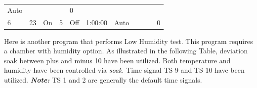 \begin{longtable}[]{@{}lllllllllll@{}}
\begin{minipage}[t]{0.08\columnwidth}
Auto\strut
\end{minipage} & \begin{minipage}[t]{0.04\columnwidth}\raggedright
\strut
\end{minipage} & \begin{minipage}[t]{0.05\columnwidth}\raggedright
\strut
\end{minipage} & \begin{minipage}[t]{0.03\columnwidth}\raggedright
\strut
\end{minipage} & \begin{minipage}[t]{0.03\columnwidth}\raggedright
0\strut
\end{minipage}\tabularnewline
\begin{minipage}[t]{0.09\columnwidth}\raggedright
6\strut
\end{minipage} & \begin{minipage}[t]{0.05\columnwidth}\raggedright
23\strut
\end{minipage} & \begin{minipage}[t]{0.09\columnwidth}\raggedright
On\strut
\end{minipage} & \begin{minipage}[t]{0.06\columnwidth}\raggedright
5\strut
\end{minipage} & \begin{minipage}[t]{0.06\columnwidth}\raggedright
Off\strut
\end{minipage} & \begin{minipage}[t]{0.12\columnwidth}\raggedright
1:00:00\strut
\end{minipage} & \begin{minipage}[t]{0.08\columnwidth}\raggedright
Auto\strut
\end{minipage} & \begin{minipage}[t]{0.04\columnwidth}\raggedright
\strut
\end{minipage} & \begin{minipage}[t]{0.05\columnwidth}\raggedright
\strut
\end{minipage} & \begin{minipage}[t]{0.03\columnwidth}\raggedright
\strut
\end{minipage} & \begin{minipage}[t]{0.03\columnwidth}\raggedright
0\strut
\end{minipage}\tabularnewline
\bottomrule
\end{longtable}

Here is another program that performs Low Humidity test. This program
requires a chamber with humidity option. As illustrated in the following
Table, deviation soak between plus and minus 10 have been utilized. Both
temperature and humidity have been controlled via \emph{soak}. Time
signal TS 9 and TS 10 have been utilized. \textbf{\emph{Note:}} TS 1 and
2 are generally the default time signals.

